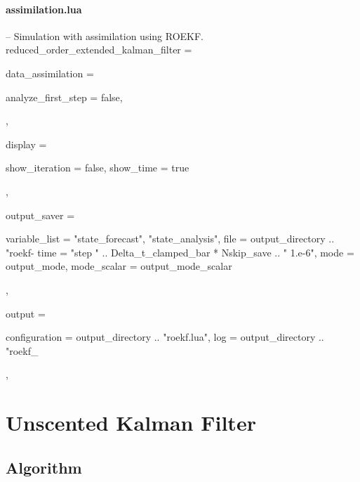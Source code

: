 \documentclass{tufte-book}
\begin{document}
 \paragraph{assimilation.lua}
 \begin{frame_lua}
-- Simulation with assimilation using ROEKF.
reduced_order_extended_kalman_filter = {

   data_assimilation = {

      analyze_first_step = false,

   },

   display = {

      show_iteration = false,
      show_time = true

   },

   output_saver = {

      variable_list = {"state_forecast", "state_analysis"},
      file = output_directory .. "roekf-%
      time = "step " .. Delta_t_clamped_bar * Nskip_save .. " 1.e-6",
      mode = output_mode,
      mode_scalar = output_mode_scalar

   },

   output = {

     configuration = output_directory .. "roekf.lua",
     log = output_directory .. "roekf_%

   },

}
 \end{frame_lua}



\hypertarget{unscented_kalman_filter}{}\section{\-Unscented Kalman Filter}\label{unscented_kalman_filter}



\hypertarget{unscented_kalman_filter_algorithm3}{}\subsection{\-Algorithm}\label{unscented_kalman_filter_algorithm3}
\end{document}
